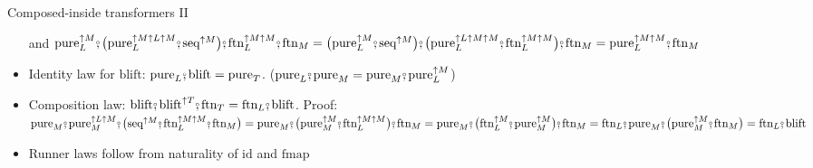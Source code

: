 \documentclass[english]{beamer}
\newcommand{\bef}{\ensuremath\raisebox{2pt}{$\mathsmaller{\mathsmaller{\circ}}$}\hspace{-3.3pt},}
\begin{document}
\begin{frame}{Composed-inside transformers II}
\begin{itemize}
{and $\text{pure}_{L}^{\uparrow M}\bef\big(\text{pure}_{L}^{\uparrow M\uparrow L\uparrow M}\bef\text{seq}^{\uparrow M}\big)\bef\text{ftn}_{L}^{\uparrow M\uparrow M}\bef\text{ftn}_{M}=\big(\text{pure}_{L}^{\uparrow M}\bef\text{seq}^{\uparrow M}\big)\bef\big(\text{pure}_{L}^{\uparrow L\uparrow M\uparrow M}\bef\text{ftn}_{L}^{\uparrow M\uparrow M}\big)\bef\text{ftn}_{M}=\text{pure}_{L}^{\uparrow M\uparrow M}\bef\text{ftn}_{M}$}{\footnotesize\par}
\item Identity law for $\text{blift}$: $\text{pure}_{L}\bef\text{blift}=\text{pure}_{T}$.{\footnotesize{}
($\text{pure}_{L}\bef\text{pure}_{M}=\text{pure}_{M}\bef\text{pure}_{L}^{\uparrow M}$)}{\footnotesize\par}
\item Composition law: $\text{blift}\bef\text{blift}^{\uparrow T}\bef\text{ftn}_{T}=\text{ftn}_{L}\bef\text{blift}$.
{\footnotesize{}Proof: $\text{pure}_{M}\bef\text{pure}_{M}^{\uparrow L\uparrow M}\bef\big(\text{seq}^{\uparrow M}\bef\text{ftn}_{L}^{\uparrow M\uparrow M}\bef\text{ftn}_{M}\big)=\text{pure}_{M}\bef\big(\text{pure}_{M}^{\uparrow M}\bef\text{ftn}_{L}^{\uparrow M\uparrow M}\big)\bef\text{ftn}_{M}=\text{pure}_{M}\bef\big(\text{ftn}_{L}^{\uparrow M}\bef\text{pure}_{M}^{\uparrow M}\big)\bef\text{ftn}_{M}=\text{ftn}_{L}\bef\text{pure}_{M}\bef\big(\text{pure}_{M}^{\uparrow M}\bef\text{ftn}_{M}\big)=\text{ftn}_{L}\bef\text{blift}$}{\footnotesize\par}
\item Runner laws follow from naturality of $\text{id}$ and $\text{fmap}$ 
\end{itemize}
\end{frame}
\end{document}

